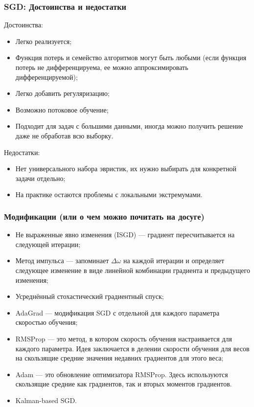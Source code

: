 \documentclass[11pt]{beamer}
\begin{document}
	\begin{frame}
		\frametitle{SGD: Достоинства и недостатки}
		Достоинства:
		\begin{itemize}
			\item Легко реализуется;
			\item Функция потерь и семейство алгоритмов могут быть любыми (если функция потерь не дифференцируема, ее можно аппроксимировать дифференцируемой);
			\item Легко добавить регуляризацию;
			\item Возможно потоковое обучение;
			\item Подходит для задач с большими данными, иногда можно получить решение даже не обработав всю выборку.
		\end{itemize}
	
		Недостатки:
		\begin{itemize}
			\item Нет универсального набора эвристик, их нужно выбирать для конкретной задачи отдельно;
	 		\item На практике остаются проблемы с локальными экстремумами.
		\end{itemize}
	\end{frame}
	
	\begin{frame}
		\frametitle{Модификации (или о чем можно почитать на досуге)}
		\begin{itemize}
			\item Не выраженные явно изменения (ISGD) --- градиент пересчитывается на следующей итерации;
			\item Метод импульса --- запоминает $ \Delta\omega $ на каждой итерации и определяет следующее изменение в виде линейной комбинации градиента и предыдущего изменения;
			\item Усреднённый стохастический градиентный спуск;
			\item AdaGrad --- модификация SGD с отдельной для каждого параметра скоростью обучения;
			\item RMSProp --- это метод, в котором скорость обучения настраивается для каждого параметра. Идея заключается в делении скорости обучения для весов на скользящие средние значения недавних градиентов для этого веса;
			\item Adam --- это обновление оптимизатора RMSProp. Здесь используются скользящие средние как градиентов, так и вторых моментов градиентов.
			\item Kalman-based SGD.
		\end{itemize}
	\end{frame}
	
\end{document}
